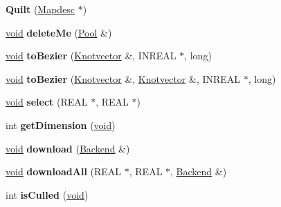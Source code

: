 \begin{DoxyCompactItemize}
\item 
\mbox{\label{class_quilt_a8f2dcef0e1544b3311223d193fb845ae}} 
{\bfseries Quilt} (\hyperlink{class_mapdesc}{Mapdesc} $\ast$)
\item 
\mbox{\label{class_quilt_a7a05e3ae2b327f3e098dd78c2b6c76cf}} 
\hyperlink{interfacevoid}{void} {\bfseries delete\+Me} (\hyperlink{class_pool}{Pool} \&)
\item 
\mbox{\label{class_quilt_a33155a09747c0bbf422bc1d0640ef2a5}} 
\hyperlink{interfacevoid}{void} {\bfseries to\+Bezier} (\hyperlink{struct_knotvector}{Knotvector} \&, I\+N\+R\+E\+AL $\ast$, long)
\item 
\mbox{\label{class_quilt_a16bfe85df95aa095ed83c09075af82d5}} 
\hyperlink{interfacevoid}{void} {\bfseries to\+Bezier} (\hyperlink{struct_knotvector}{Knotvector} \&, \hyperlink{struct_knotvector}{Knotvector} \&, I\+N\+R\+E\+AL $\ast$, long)
\item 
\mbox{\label{class_quilt_a5764948a76328c9a7d3c987b40c6a4f7}} 
\hyperlink{interfacevoid}{void} {\bfseries select} (R\+E\+AL $\ast$, R\+E\+AL $\ast$)
\item 
\mbox{\label{class_quilt_a99e10a26a7f998cb53d7aa2679108de7}} 
int {\bfseries get\+Dimension} (\hyperlink{interfacevoid}{void})
\item 
\mbox{\label{class_quilt_ace8b6f47e733b03ba405b5a26e3a6404}} 
\hyperlink{interfacevoid}{void} {\bfseries download} (\hyperlink{class_backend}{Backend} \&)
\item 
\mbox{\label{class_quilt_abdd08fc0154c046230c946094e169129}} 
\hyperlink{interfacevoid}{void} {\bfseries download\+All} (R\+E\+AL $\ast$, R\+E\+AL $\ast$, \hyperlink{class_backend}{Backend} \&)
\item 
\mbox{\label{class_quilt_a7a27aa968d6ad4023dcd0a9fdbeb0721}} 
int {\bfseries is\+Culled} (\hyperlink{interfacevoid}{void})
\item 
\mbox{\label{class_quilt_acec314b72377eda7640d802217e32622}} 

\end{DoxyCompactItemize}

